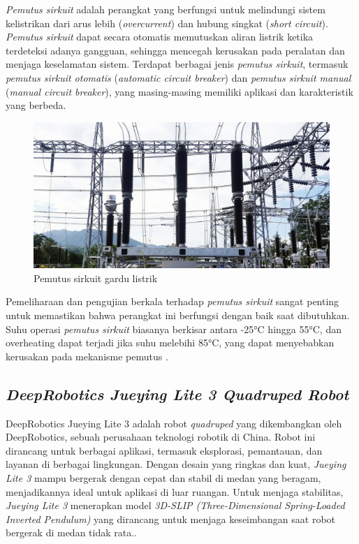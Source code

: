 \emph{Pemutus sirkuit} adalah perangkat yang berfungsi untuk melindungi sistem kelistrikan dari arus lebih (\emph{overcurrent}) dan hubung singkat (\emph{short circuit}). \emph{Pemutus sirkuit} dapat secara otomatis memutuskan aliran listrik ketika terdeteksi adanya gangguan, sehingga mencegah kerusakan pada peralatan dan menjaga keselamatan sistem. Terdapat berbagai jenis \emph{pemutus sirkuit}, termasuk \emph{pemutus sirkuit otomatis} (\emph{automatic circuit breaker}) dan \emph{pemutus sirkuit manual} (\emph{manual circuit breaker}), yang masing-masing memiliki aplikasi dan karakteristik yang berbeda. 

\begin{figure} [H] \centering
  \includegraphics[scale=0.45]{gambar/cb.png}
  \caption{Pemutus sirkuit gardu listrik}
  \label{fig:cb gardu listrik}
\end{figure}
Pemeliharaan dan pengujian berkala terhadap \emph{pemutus sirkuit} sangat penting untuk memastikan bahwa perangkat ini berfungsi dengan baik saat dibutuhkan. Suhu operasi \emph{pemutus sirkuit} biasanya berkisar antara -25°C hingga 55°C, dan overheating dapat terjadi jika suhu melebihi 85°C, yang dapat menyebabkan kerusakan pada mekanisme pemutus \cite{Ilomets2020}.


\subsection{\emph{DeepRobotics Jueying Lite 3 Quadruped Robot}}
DeepRobotics Jueying Lite 3 adalah robot \emph{quadruped} yang dikembangkan oleh DeepRobotics, sebuah perusahaan teknologi robotik di China. Robot ini dirancang untuk berbagai aplikasi, termasuk eksplorasi, pemantauan, dan layanan di berbagai lingkungan. Dengan desain yang ringkas dan kuat, \emph{Jueying Lite 3} mampu bergerak dengan cepat dan stabil di medan yang beragam, menjadikannya ideal untuk aplikasi di luar ruangan. Untuk menjaga stabilitas, \emph{Jueying Lite 3} menerapkan model \emph{3D-SLIP (Three-Dimensional Spring-Loaded Inverted Pendulum)} yang dirancang untuk menjaga keseimbangan saat robot bergerak di medan tidak rata.\cite{deep2024perception}.

